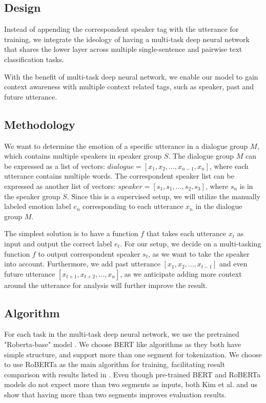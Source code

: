 \documentclass[11pt]{article}
\begin{document}
\subsection{Design}

Instead of appending the correspondent speaker tag with the utterance for training, we integrate the ideology of having a multi-task deep neural network that shares the lower layer across multiple single-sentence and pairwise text classification tasks. 

With the benefit of multi-task deep neural network, we enable our model to gain context awareness with multiple context related tags, such as speaker, past and future utterance.

\subsection{Methodology}

We want to determine the emotion of a specific utterance in a dialogue group $M$, which contains multiple speakers in speaker group $S$. The dialogue group $M$ can be expressed as a list of vectors: $dialogue = [x_1, x_2, ..., x_{n-1}, x_n]$, where each utterance contains multiple words. The correspondent speaker list can be expressed as another list of vectors: $speaker = [s_1, s_1, ..., s_2, s_3]$, where $s_n$ is in the speaker group $S$. Since this is a supervised setup, we will utilize the manually labeled emotion label $e_n$ corresponding to each utterance $x_n$ in the dialogue group $M$.

The simplest solution is to have a function $f$ that takes each utterance $x_t$ as input and output the correct label $e_t$. For our setup, we decide on a multi-tasking function $f$ to output correspondent speaker $s_t$, as we want to take the speaker into account. Furthermore, we add past utterance $[x_1, x_2, ..., x_{t-1}]$ and even future utterance $[x_{t+1}, x_{t+2}, ..., x_n]$, as we anticipate adding more context around the utterance for analysis will further improve the result.


\subsection{Algorithm}

For each task in the multi-task deep neural network, we use the pretrained "Roberta-base" model \citet{liu-etal-2019-multi}. We choose BERT like algorithms as they both have simple structure, and support more than one segment for tokenization. We choose to use RoBERTa as the main algorithm for training, facilitating result comparison with results listed in \citet{kim-2021-emoberta}. Even though pre-trained BERT and RoBERTa models do not expect more than two segments as inputs, both Kim et al. and us show that having more than two segments improves evaluation results.
\end{document}
